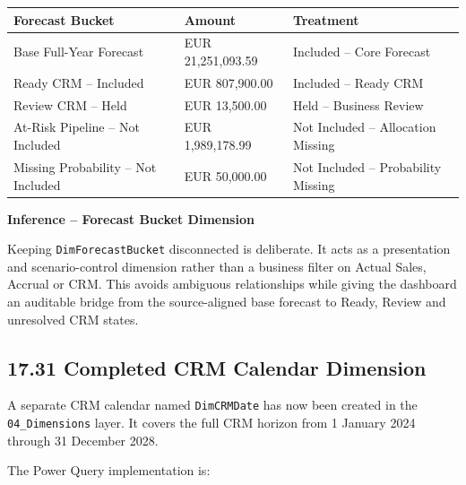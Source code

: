 \documentclass[11pt,a4paper]{article}
\begin{document}
\begin{tabularx}{\textwidth}{
    >{\raggedright\arraybackslash}p{5.0cm}
    >{\raggedleft\arraybackslash}p{3.0cm}
    X
}

\toprule

Forecast Bucket
&
Amount
&
Treatment
\\

\midrule

Base Full-Year Forecast
&
EUR 21,251,093.59
&
Included -- Core Forecast
\\

Ready CRM -- Included
&
EUR 807,900.00
&
Included -- Ready CRM
\\

Review CRM -- Held
&
EUR 13,500.00
&
Held -- Business Review
\\

At-Risk Pipeline -- Not Included
&
EUR 1,989,178.99
&
Not Included -- Allocation Missing
\\

Missing Probability -- Not Included
&
EUR 50,000.00
&
Not Included -- Probability Missing
\\

\bottomrule

\end{tabularx}

\begin{inferencebox}

\textbf{Inference -- Forecast Bucket Dimension}

Keeping \texttt{DimForecastBucket} disconnected is deliberate. It acts as a
presentation and scenario-control dimension rather than a business filter on
Actual Sales, Accrual or CRM. This avoids ambiguous relationships while giving
the dashboard an auditable bridge from the source-aligned base forecast to
Ready, Review and unresolved CRM states.

\end{inferencebox}

\subsection{17.31 Completed CRM Calendar Dimension}

A separate CRM calendar named \texttt{DimCRMDate} has now been created in the
\texttt{04\_Dimensions} layer. It covers the full CRM horizon from 1 January
2024 through 31 December 2028.

The Power Query implementation is:
\end{document}
